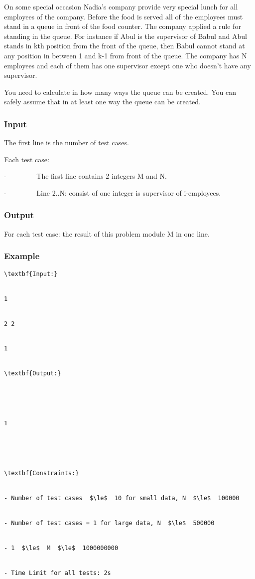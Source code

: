 



   On some special occasion Nadia’s company provide very special lunch for all employees of the company. Before the food is served all of the employees must stand in a queue in front of the food counter. The company applied a rule for standing in the queue. For instance if Abul is the supervisor of Babul and Abul stands in kth position from the front of the queue, then Babul cannot stand at any position in between 1 and k-1 from front of the queue. The company has N employees and each of them has one supervisor except one who doesn’t have any supervisor.  

   You need to calculate in how many ways the queue can be created. You can safely assume that in at least one way the queue can be created.  

\subsubsection{   Input  }

   The first line is the number of test cases.  

   Each test case:  

   -         The first line contains 2 integers M and N.  

   -         Line 2..N: consist of one integer is supervisor of i-employees.  

\subsubsection{   Output  }

   For each test case: the result of this problem module M in one line.  

\subsubsection{   Example  }
\begin{verbatim}
\textbf{Input:}


1


2 2


1


\textbf{Output:}





1





\textbf{Constraints:}


- Number of test cases  $\le$  10 for small data, N  $\le$  100000


- Number of test cases = 1 for large data, N  $\le$  500000


- 1  $\le$  M  $\le$  1000000000


- Time Limit for all tests: 2s\end{verbatim}
